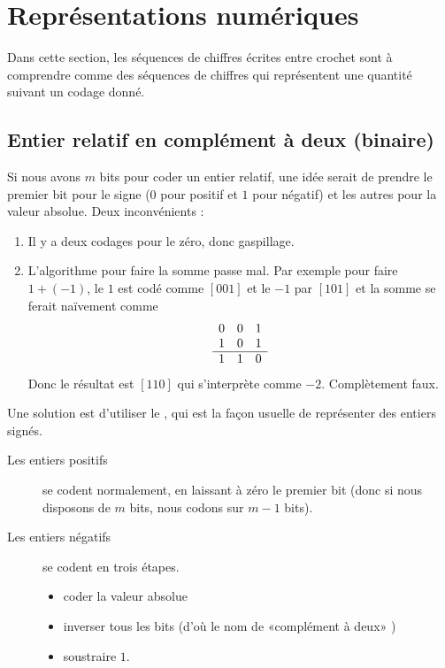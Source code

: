 \section{Représentations numériques}

Dans cette section, les séquences de chiffres écrites entre crochet sont à comprendre comme des séquences de chiffres qui représentent une quantité suivant un codage donné.

\subsection{Entier relatif en complément à deux (binaire)}

Si nous avons \( m\) bits pour coder un entier relatif, une idée serait de prendre le premier bit pour le signe (\( 0\) pour positif et \( 1\) pour négatif) et les autres pour la valeur absolue. Deux inconvénients :
\begin{enumerate}
	\item
	      Il y a deux codages pour le zéro, donc gaspillage.
	\item
	      L'algorithme pour faire la somme passe mal. Par exemple pour faire \( 1+(-1)\), le \( 1\) est codé comme \( [001]\) et le \( -1\) par \( [101]\) et la somme se ferait naïvement comme
	      \begin{equation*}
		      \begin{array}[]{ccc}
			      0 & 0 & 1 \\
			      1 & 0 & 1 \\
			      \hline
			      1 & 1 & 0 \\
		      \end{array}
	      \end{equation*}
	      Donc le résultat est \( [110]\) qui s'interprète comme \( -2\). Complètement faux.
\end{enumerate}
Une solution est d'utiliser le , qui est la façon usuelle de représenter des entiers signés.
\begin{description}
	\item[Les entiers positifs] se codent normalement, en laissant à zéro le premier bit (donc si nous disposons de \( m\) bits, nous codons sur \( m-1\) bits).
	\item[Les entiers négatifs] se codent en trois étapes.
		\begin{itemize}
			\item coder la valeur absolue
			\item inverser tous les bits (d'où le nom de «complément à deux» )
			\item soustraire \( 1\).
		\end{itemize}
\end{description}

